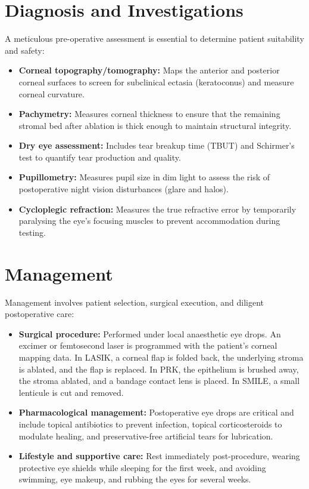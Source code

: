 \section*{Diagnosis and Investigations}
A meticulous pre-operative assessment is essential to determine patient suitability and safety:
\begin{itemize}
    \item \textbf{Corneal topography/tomography:} Maps the anterior and posterior corneal surfaces to screen for subclinical ectasia (keratoconus) and measure corneal curvature.
    \item \textbf{Pachymetry:} Measures corneal thickness to ensure that the remaining stromal bed after ablation is thick enough to maintain structural integrity.
    \item \textbf{Dry eye assessment:} Includes tear breakup time (TBUT) and Schirmer's test to quantify tear production and quality.
    \item \textbf{Pupillometry:} Measures pupil size in dim light to assess the risk of postoperative night vision disturbances (glare and halos).
    \item \textbf{Cycloplegic refraction:} Measures the true refractive error by temporarily paralysing the eye's focusing muscles to prevent accommodation during testing.
\end{itemize}

\section*{Management}
Management involves patient selection, surgical execution, and diligent postoperative care:
\begin{itemize}
    \item \textbf{Surgical procedure:} Performed under local anaesthetic eye drops. An excimer or femtosecond laser is programmed with the patient's corneal mapping data. In LASIK, a corneal flap is folded back, the underlying stroma is ablated, and the flap is replaced. In PRK, the epithelium is brushed away, the stroma ablated, and a bandage contact lens is placed. In SMILE, a small lenticule is cut and removed.
    \item \textbf{Pharmacological management:} Postoperative eye drops are critical and include topical antibiotics to prevent infection, topical corticosteroids to modulate healing, and preservative-free artificial tears for lubrication.
    \item \textbf{Lifestyle and supportive care:} Rest immediately post-procedure, wearing protective eye shields while sleeping for the first week, and avoiding swimming, eye makeup, and rubbing the eyes for several weeks.
\end{itemize}

